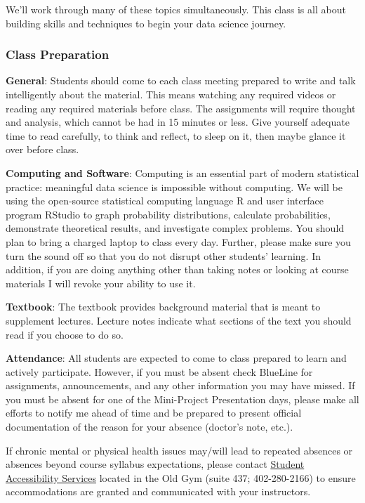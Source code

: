 \documentclass[
  11pt,
  letterpaper,
  DIV=11,
  numbers=noendperiod]{scrartcl}
\begin{document}
We'll work through many of these topics simultaneously. This class is
all about building skills and techniques to begin your data science
journey.

\subsubsection{Class Preparation}\label{class-preparation}

\textbf{General}: Students should come to each class meeting prepared to
write and talk intelligently about the material. This means watching any
required videos or reading any required materials before class. The
assignments will require thought and analysis, which cannot be had in 15
minutes or less. Give yourself adequate time to read carefully, to think
and reflect, to sleep on it, then maybe glance it over before class.

\textbf{Computing and Software}: Computing is an essential part of
modern statistical practice: meaningful data science is impossible
without computing. We will be using the open-source statistical
computing language R and user interface program RStudio to graph
probability distributions, calculate probabilities, demonstrate
theoretical results, and investigate complex problems. You should plan
to bring a charged laptop to class every day. Further, please make sure
you turn the sound off so that you do not disrupt other students'
learning. In addition, if you are doing anything other than taking notes
or looking at course materials I will revoke your ability to use it.

\textbf{Textbook}: The textbook provides background material that is
meant to supplement lectures. Lecture notes indicate what sections of
the text you should read if you choose to do so.

\textbf{Attendance}: All students are expected to come to class prepared
to learn and actively participate. However, if you must be absent check
BlueLine for assignments, announcements, and any other information you
may have missed. If you must be absent for one of the Mini-Project
Presentation days, please make all efforts to notify me ahead of time
and be prepared to present oﬀicial documentation of the reason for your
absence (doctor's note, etc.).

If chronic mental or physical health issues may/will lead to repeated
absences or absences beyond course syllabus expectations, please contact
\href{https://www.creighton.edu/student-success/student-accessibility-services}{Student
Accessibility Services} located in the Old Gym (suite 437; 402-280-2166)
to ensure accommodations are granted and communicated with your
instructors.
\end{document}
